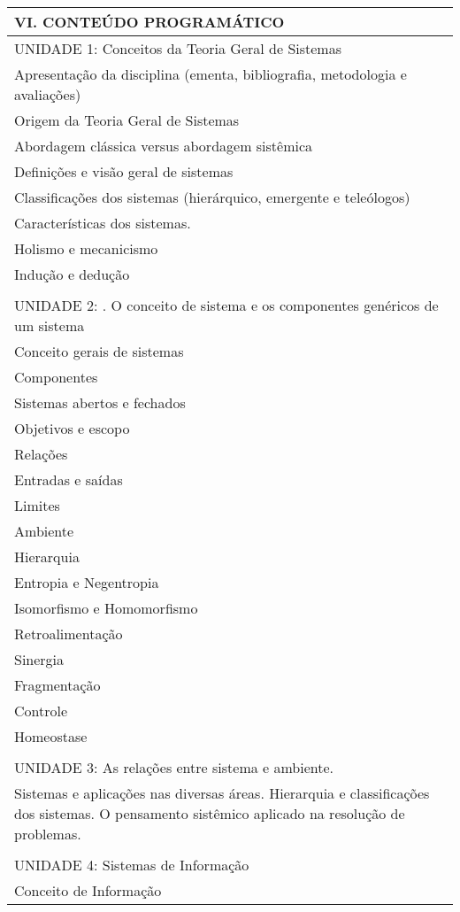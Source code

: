 \documentclass[12pt]{article}
\begin{document}
\begin{longtable}{|L{1.025\textwidth}|} \hline
%
{\bf VI. CONTEÚDO PROGRAMÁTICO } \\ \hline
UNIDADE 1: Conceitos da Teoria Geral de Sistemas\\
 Apresentação da disciplina (ementa, bibliografia, metodologia e avaliações)\\
 Origem da Teoria Geral de Sistemas\\
 Abordagem clássica versus abordagem sistêmica\\
 Definições e visão geral de sistemas\\
 Classificações dos sistemas (hierárquico, emergente e teleólogos)\\
 Características dos sistemas.\\
 Holismo e mecanicismo\\
 Indução e dedução\\
\\
UNIDADE 2: . O conceito de sistema e os componentes genéricos de um sistema\\
 Conceito gerais de sistemas\\
 Componentes\\
 Sistemas abertos e fechados\\
 Objetivos e escopo\\
 Relações\\
 Entradas e saídas\\
 Limites\\
 Ambiente\\
 Hierarquia\\
 Entropia e Negentropia\\
 Isomorfismo e Homomorfismo\\
 Retroalimentação\\
 Sinergia\\
 Fragmentação\\
 Controle\\
 Homeostase\\
\\
UNIDADE 3: As relações entre sistema e ambiente. \\
Sistemas e aplicações nas diversas áreas. Hierarquia e classificações dos sistemas. O pensamento sistêmico aplicado na resolução de problemas.\\
\\
UNIDADE 4: Sistemas de Informação\\
 Conceito de Informação\\

\end{longtable}
\end{document}
